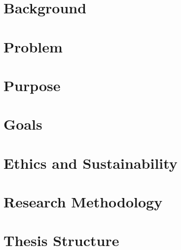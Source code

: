 

\section{Background}
    \label{sec:background}
    

\section{Problem}
    \label{sec:problem}
    

\section{Purpose}
    \label{sec:purpose}
    

\section{Goals}
    \label{sec:goals}
    

\section{Ethics and Sustainability}
    \label{sec:ethics_and_sustainability}
    

\section{Research Methodology}
    \label{sec:research_methodology}
    

\section{Thesis Structure}
    \label{sec:structure_thesis}
    